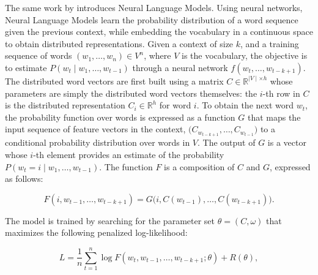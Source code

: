 

The same work by \citet{bengio2000neural} introduces Neural Language Models. Using neural networks, Neural Language Models learn the probability distribution of a word sequence given the previous context, while embedding the vocabulary in a continuous space to obtain distributed representations. Given a context of size $k$, and a training sequence of words $(w_1, \ldots, w_n) \in V^n$, where $V$ is the vocabulary, the objective is to estimate $P(w_t \mid w_1, \ldots, w_{t-1})$ through a neural network $f(w_t, \ldots, w_{t-k+1})$. The distributed word vectors are first built using a matrix $C \in \mathbb{R}^{\mid V \mid \times h}$ whose parameters are simply the distributed word vectors themselves: the $i$-th row in $C$ is the distributed representation $C_i \in \mathbb{R}^h$ for word $i$. To obtain the next word $w_t$, the probability function over words is expressed as a function $G$ that maps the input sequence of feature vectors in the context, $\bigl(C_{w_{t-k+1}}, \ldots, C_{w_{t-1}}\bigr)$ to a conditional probability distribution over words in $V$. The output of $G$ is a vector whose $i$-th element provides an estimate of the probability $P(w_t = i \mid w_1, \ldots, w_{t-1})$. The function $F$ is a composition of $C$ and $G$, expressed as follows:

\begin{equation}
    F(i, w_{t-1}, \ldots, w_{t-k+1}) = G\bigl(i, C(w_{t-1}), \ldots, C(w_{t-k+1})\bigr).
\label{eq:nlm-bengio}
\end{equation}

The model is trained by searching for the parameter set $\theta = (C, \omega)$ that maximizes the following penalized log-likelihood:

\begin{equation}
    L = \frac{1}{n} \sum_{t=1}^n \log F(w_t, w_{t-1}, \ldots, w_{t-k+1}; \theta) + R(\theta),
\label{eq:nlm-log-likelihood}
\end{equation}

